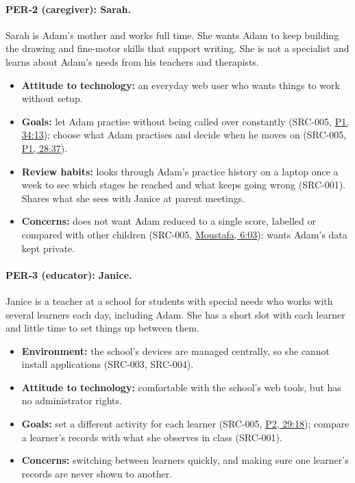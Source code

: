 \documentclass[12pt]{article}
\renewcommand{\_}{\textunderscore\allowbreak}%
\newcommand{\intlink}[3]{\hyperref[int:#1-#2]{#3}}
\newcommand{\intref}[2]{\intlink{#1}{#2}{#1, #2}}
\begin{document}
\paragraph{PER-2 (caregiver): Sarah.}
Sarah is Adam's mother and works full time. She wants Adam to keep building the
drawing and fine-motor skills that support writing. She is not a specialist and
learns about Adam's needs from his teachers and therapists.
\begin{itemize}
  \item \textbf{Attitude to technology:} an everyday web user who wants things
  to work without setup.
  \item \textbf{Goals:} let Adam practise without being called over constantly
  (SRC-005, \intref{P1}{34:13}); choose what Adam practises and decide when he
  moves on (SRC-005, \intref{P1}{28:37}).
  \item \textbf{Review habits:} looks through Adam's practice history on a
  laptop once a week to see which stages he reached and what keeps going wrong
  (SRC-001). Shares what she sees with Janice at parent meetings.
  \item \textbf{Concerns:} does not want Adam reduced to a single score,
  labelled or compared with other children (SRC-005, \intref{Moustafa}{6:03});
  wants Adam's data kept private.
\end{itemize}

\paragraph{PER-3 (educator): Janice.}
Janice is a teacher at a school for students with special needs who works with
several learners each day, including Adam. She has a short slot with each
learner and little time to set things up between them.
\begin{itemize}
  \item \textbf{Environment:} the school's devices are managed centrally, so she
  cannot install applications (SRC-003, SRC-004).
  \item \textbf{Attitude to technology:} comfortable with the school's web
  tools, but has no administrator rights.
  \item \textbf{Goals:} set a different activity for each learner (SRC-005,
  \intref{P2}{29:18}); compare a learner's records with what she observes in
  class (SRC-001).
  \item \textbf{Concerns:} switching between learners quickly, and making sure
  one learner's records are never shown to another.
\end{itemize}
\end{document}
